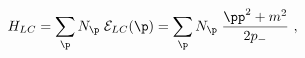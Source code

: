\begin{equation}
\label{eq:M particle Hamiltonian 1}
    H_{LC} = \sum_{\p} N_\p \;
             {\cal E}_{LC}(\p)
           = \sum_{\p} N_\p \;
             \frac{\pp^2 + m^2}{2 p_-} \ ,
\end{equation}

